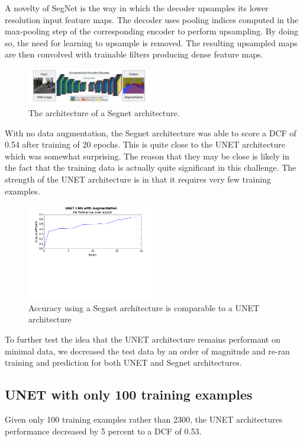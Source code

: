 \documentclass[letterpaper]{article}
\begin{document}
A novelty of SegNet  is the way in which the decoder upsamples its lower resolution input feature maps. The decoder uses pooling indices computed in the max-pooling step of the corresponding encoder to perform upsampling. By doing so, the need for learning to upsample is removed. The resulting upsampled maps are then convolved with trainable filters producing dense feature maps. 

 \begin{figure}[H]
  \centerline{\includegraphics[width=0.5\textwidth]{Images/SegNetArchitecture.png}}
  \caption{The architecture of a Segnet architecture.}
  \label{fig:segnet}
\end{figure}


With no data augmentation, the Segnet architecture was able to score a DCF of 0.54 after training of 20 epochs. This is quite close to the UNET architecture which was somewhat surprising. The reason that they may be close is likely in the fact that the training data is actually quite significant in this challenge. The strength of the UNET architecture is in that it requires very few training examples.


 \begin{figure}[H]
  \centerline{\includegraphics[width=0.5\textwidth]{Plots/SegNet.png}}
  \caption{Accuracy using a Segnet architecture is comparable to a UNET architecture}
  \label{fig:trainingovertime2.}
\end{figure}

To further test the idea that the UNET architecture remains performant on minimal data, we decreased the test data by an order of magnitude and re-ran training and prediction for both UNET and Segnet architectures. 

\subsection{UNET with only 100 training examples}
Given only 100 training examples rather than 2300, the UNET architectures performance decreased by 5 percent to a DCF of 0.53. 
\end{document}
